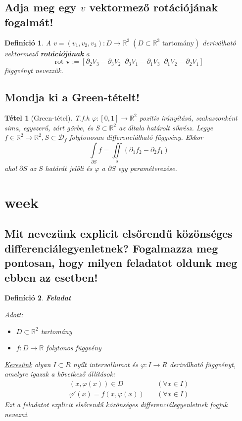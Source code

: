 \documentclass[12pt,a4paper]{article}
\newcommand{\R}{\mathbb{R}}
\newcommand{\CD}{\mathcal{D}}
\newcommand{\f}{\varphi}
\newcommand{\bb}[1]{\left( #1 \right)}
\newcommand{\boxes}[1]{\left[ #1 \right]}
\newtheorem{tet}{Tétel}[section]
\newtheorem{defi}{Definíció}[section]
\begin{document}
\subsection{Adja meg egy $v$ vektormező rotációjának fogalmát!}
\begin{defi}
A $v = \bb{v_1,v_2,v_3} : D \to \R^3 \; \bb{ D \subset \R^3  \text{ tartomány} }$ deriválható vektormező \textbf{rotációjának} a 
\[
\text{rot } \textbf{v}:=\boxes{\partial_2V_3-\partial_3V_2 \;\; \partial_3V_1-\partial_1V_3 \;\; \partial_1V_2-\partial_2V_1}
\]
függvényt nevezzük.
\end{defi}
\subsection{Mondja ki a Green-tételt!}
\begin{tet}[Green-tétel]
T.f.h $\f : \boxes{0,1} \to \R^2$ pozitív irányítású, szakaszonként sima, egyszerű, zárt görbe, és $S \subset \R^2$ az általa határolt síkrész.
Legye $f \in \R^2 \to \R^2, S \subset \CD_f$ folytonosan differenciálható függvény. Ekkor
\[
\int\limits_{\partial S} f = \iint\limits_s (\partial_1f_2-\partial_2f_1)
\]
ahol $\partial S$ az $S$ határát jelöli és $\f$ a $\partial S$ egy paraméterezése.
\end{tet}
\newpage
\section{week}
\subsection{Mit nevezünk explicit elsőrendű közönséges differenciálegyenletnek? Fogalmazza meg pontosan, hogy milyen feladatot oldunk meg ebben az esetben!}
\begin{defi}
\textbf{Feladat}

\underline{Adott:} \begin{itemize}
\item $D \subset \R^2$ tartomány
\item $f : D \to \R $ folytonos függvény
\end{itemize}
\underline{Keresünk} olyan $I \subset R$ nyílt intervallumot és $\f : I \to R$ deriválható függvényt, amelyre igazak a következő állítások:
\begin{align*}
\bb{x,\f(x)} \in D \quad &\bb{\forall x \in I} \\
\f'(x) = f\bb{x,\f(x)} \quad &\bb{\forall x \in I}
\end{align*}
Ezt a feladatot explicit elsőrendű közönséges differenciálegyenletnek fogjuk nevezni.
\end{defi}
\end{document}
